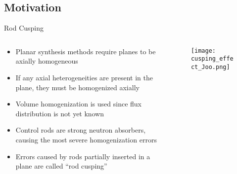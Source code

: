 \subsection{Motivation}
\begin{frame}[t]{Rod Cusping}

\begin{columns}
    \begin{column}{0.6\textwidth}
        \begin{itemize}
            \item Planar synthesis methods require planes to be axially homogeneous
            \item If any axial heterogeneities are present in the plane, they must be homogenized axially
            \item Volume homogenization is used since flux distribution is not yet known
            \item Control rods are strong neutron absorbers, causing the most severe homogenization errors
            \item Errors caused by rods partially inserted in a plane are called ``rod cusping''
        \end{itemize}
    \end{column}
    \begin{column}{0.4\textwidth}
        \begin{figure}[h]
            \centering
            \texttt{[image: cusping\_effect\_Joo.png]}
        \end{figure} 
    \end{column}
\end{columns}

\end{frame}



